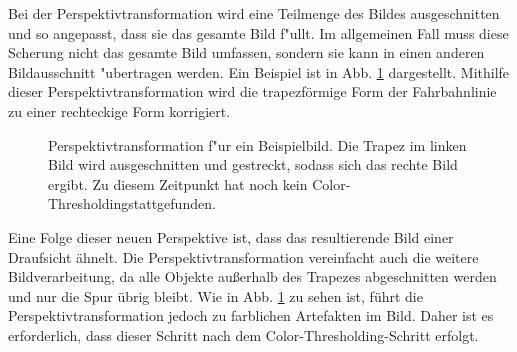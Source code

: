 \documentclass[arbeit=studie,oneside,BCOR=12mm]{ArbeitRST}
\begin{document}
Bei der Perspektivtransformation wird eine Teilmenge des Bildes ausgeschnitten
und so angepasst, dass sie das gesamte Bild f"ullt. Im allgemeinen Fall muss
diese Scherung nicht das gesamte Bild umfassen, sondern sie kann in einen
anderen Bildausschnitt "ubertragen werden. Ein Beispiel ist in Abb.
\ref{roi-pt} dargestellt. Mithilfe dieser Perspektivtransformation wird die
trapezförmige Form der Fahrbahnlinie zu einer rechteckige Form korrigiert. \\

\begin{figure}[h]
    \centering
    \caption{Perspektivtransformation f"ur ein Beispielbild. Die Trapez im linken
    Bild wird ausgeschnitten und gestreckt, sodass sich das rechte Bild ergibt.
    Zu diesem Zeitpunkt hat noch kein \glqq Color-Thresholding\grqq stattgefunden.}
    \label{roi-pt}
\end{figure}

Eine Folge dieser neuen Perspektive ist, dass das resultierende Bild einer
Draufsicht ähnelt. Die Perspektivtransformation vereinfacht auch die weitere
Bildverarbeitung, da alle Objekte außerhalb des Trapezes abgeschnitten werden
und nur die Spur übrig bleibt. Wie in Abb. \ref{roi-pt} zu sehen ist, führt die
Perspektivtransformation jedoch zu farblichen Artefakten im Bild. Daher ist es
erforderlich, dass dieser Schritt nach dem \glqq Color-Thresholding\grqq-Schritt
erfolgt.
\end{document}
